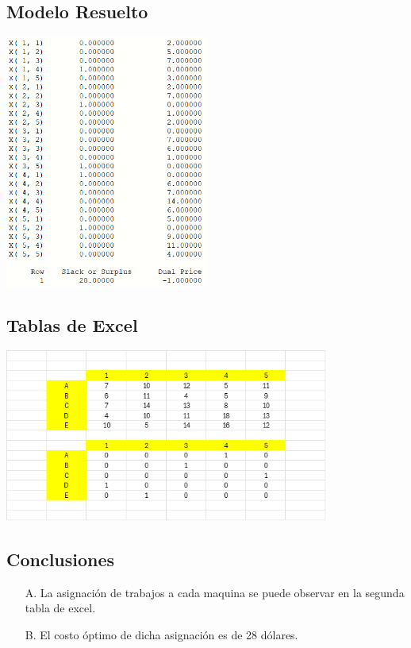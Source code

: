 \documentclass[12pt]{article}
\begin{document}
\subsection*{Modelo Resuelto}
\begin{center}
  \includegraphics[width=0.5\textwidth]{./assets/solved_model2.PNG}
\end{center}

\subsection*{Tablas de Excel}
\begin{center}
  \includegraphics[width=0.8\textwidth]{./assets/excel2.png}
\end{center}

\subsection*{Conclusiones}
\begin{itemize}
  \item [A.] La asignación de trabajos a cada maquina se puede observar en la segunda tabla de excel.
  \item [B.] El costo óptimo de dicha asignación es de 28 dólares.
\end{itemize}
\end{document}
